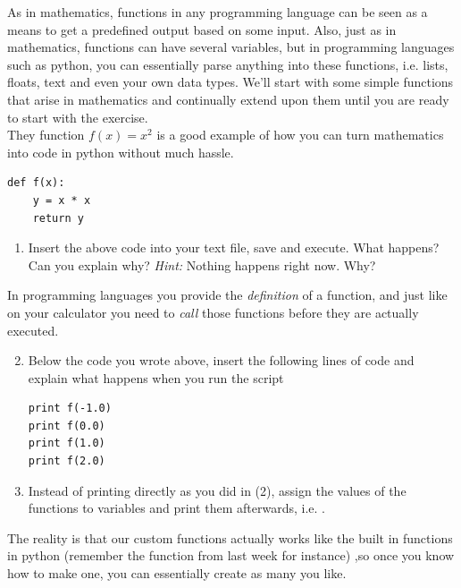 \documentclass{article}
\begin{document}
As in mathematics, functions in any programming language can be seen as a
means to get a predefined output based on some input. Also, just as in
mathematics, functions can have several variables, but in programming languages
such as python, you can essentially parse anything into these
functions, i.e. lists, floats, text and even your own data types. We'll start with some simple functions that arise in mathematics and
continually extend upon them until you are ready to start with the exercise.\\

They function $f(x)=x^2$ is a good example of how you can turn mathematics into code in python without much hassle.

\begin{lstlisting}
def f(x):
    y = x * x
    return y
\end{lstlisting}


\begin{enumerate}
  \item Insert the above code into your text file, save and execute. What
      happens? Can you explain why? {\em Hint:} Nothing happens right now. Why?
\end{enumerate}

In programming languages you provide the {\em definition} of a function, and
just like on your calculator you need to {\em call} those functions before they
are actually executed.

\begin{enumerate}
  \setcounter{enumi}{1}
  \item Below the code you wrote above, insert the following lines of code and
    explain what happens when you run the script

\begin{lstlisting}
print f(-1.0)
print f(0.0)
print f(1.0)
print f(2.0)
\end{lstlisting}

  \item Instead of printing directly as you did in (2), assign the values of
    the functions to variables and print them afterwards, i.e. .

\end{enumerate}

The reality is that our custom functions actually works like the built in
functions in python (remember the  function from last week for instance)
,so once you know how to make one, you can essentially create as many you like.\\
\end{document}
